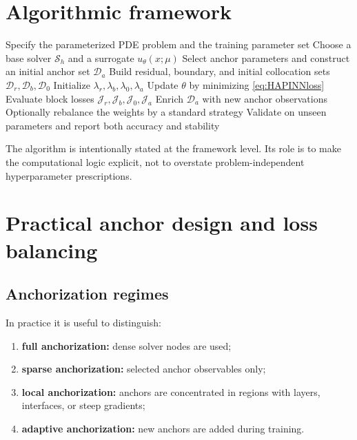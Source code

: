 \documentclass[preprint,12pt]{elsarticle}
\theoremstyle{definition}
\numberwithin{equation}{section}
\newcommand{\cS}{\mathcal{S}}
\newcommand{\cD}{\mathcal{D}}
\newcommand{\cJ}{\mathcal{J}}
\begin{document}
\section{Algorithmic framework}
\label{sec:algorithm}

\begin{algorithm}[H]
\caption{General HAPINN training loop}
\label{alg:hapinn}
\begin{algorithmic}[1]
\State Specify the parameterized PDE problem and the training parameter set
\State Choose a base solver $\cS_h$ and a surrogate $u_\theta(x;\mu)$
\State Select anchor parameters and construct an initial anchor set $\cD_a$
\State Build residual, boundary, and initial collocation sets $\cD_r,\cD_b,\cD_0$
\State Initialize $\lambda_r,\lambda_b,\lambda_0,\lambda_a$
    \State Update $\theta$ by minimizing \eqref{eq:HAPINNloss}
    \State Evaluate block losses $\cJ_r,\cJ_b,\cJ_0,\cJ_a$
        \State Enrich $\cD_a$ with new anchor observations
    \EndIf
    \State Optionally rebalance the weights by a standard strategy
\EndFor
\State Validate on unseen parameters and report both accuracy and stability
\end{algorithmic}
\end{algorithm}

The algorithm is intentionally stated at the framework level. Its role is to make the computational logic explicit, not to overstate problem-independent hyperparameter prescriptions.

\section{Practical anchor design and loss balancing}
\label{sec:practical}

\subsection{Anchorization regimes}

In practice it is useful to distinguish:
\begin{enumerate}[label=\arabic*)]
    \item \textbf{full anchorization:} dense solver nodes are used;
    \item \textbf{sparse anchorization:} selected anchor observables only;
    \item \textbf{local anchorization:} anchors are concentrated in regions with layers, interfaces, or steep gradients;
    \item \textbf{adaptive anchorization:} new anchors are added during training.
\end{enumerate}
\end{document}
